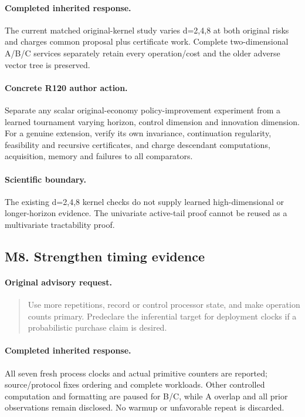 \paragraph{Completed inherited response.}
The current matched original-kernel study varies d=2,4,8 at both original risks and charges common proposal plus certificate work. Complete two-dimensional A/B/C services separately retain every operation/cost and the older adverse vector tree is preserved.
\paragraph{Concrete R120 author action.}
Separate any scalar original-economy policy-improvement experiment from a learned tournament varying horizon, control dimension and innovation dimension. For a genuine extension, verify its own invariance, continuation regularity, feasibility and recursive certificates, and charge descendant computations, acquisition, memory and failures to all comparators.
\paragraph{Scientific boundary.}
The existing d=2,4,8 kernel checks do not supply learned high-dimensional or longer-horizon evidence. The univariate active-tail proof cannot be reused as a multivariate tractability proof.

\subsection{M8. Strengthen timing evidence}
\label{response120:M8}
\paragraph{Original advisory request.}
\begin{quote}
Use more repetitions, record or control processor state, and make operation counts primary. Predeclare the inferential target for deployment clocks if a probabilistic purchase claim is desired.
\end{quote}
\paragraph{Completed inherited response.}
All seven fresh process clocks and actual primitive counters are reported; source/protocol fixes ordering and complete workloads. Other controlled computation and formatting are paused for B/C, while A overlap and all prior observations remain disclosed. No warmup or unfavorable repeat is discarded.
